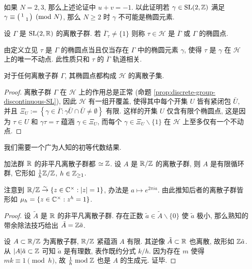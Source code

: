 \begin{exercise}\label{exo:Gamma-neat}
	如果 $N = 2,3$, 那么上述论证中 $u + v = -1$. 以此证明若 $\gamma \in \operatorname{SL}(2,\mathbb{Z})$ 满足 $\gamma \equiv \bigl(\begin{smallmatrix} 1 &  \\  & 1 \end{smallmatrix}\bigr) \pmod{N}$, 那么 $N \geq 2$ 时 $\gamma$ 不可能是椭圆元素.
\end{exercise}

\begin{definition}[椭圆点]\label{def:elliptic-point} 
	设 $\Gamma$ 是 $\operatorname{SL}(2,\mathbb{R})$ 的离散子群. 若 $\overline{\Gamma}_\tau \neq \{1\}$ 则称 $\tau \in \mathcal{H}$ 是 $\overline{\Gamma}$ 或 $\Gamma$ 的椭圆点.
\end{definition}

由定义立见 $\tau$ 是 $\Gamma$ 的椭圆点当且仅当存在 $\Gamma$ 中的椭圆元素 $\gamma$, 使得 $\tau$ 是 $\gamma$ 在 $\mathcal{H}$ 上的唯一不动点. 此性质只和 $\tau$ 的 $\overline{\Gamma}$ 轨道相关.

\begin{lemma}\label{prop:elliptic-pt-discrete}
	对于任何离散子群 $\Gamma$, 其椭圆点都构成 $\mathcal{H}$ 的离散子集.
\end{lemma}
\begin{proof}
	离散子群 $\Gamma$ 在 $\mathcal{H}$ 上的作用总是正常 (命题 \ref{prop:discrete-group-discontinuous-SL}), 因此 $\mathcal{H}$ 有一组开覆盖, 使得其中每个开集 $U$ 皆有紧闭包 $\bar{U}$, 并且 $\Xi_U := \left\{ \gamma \in \overline{\Gamma}: \gamma\bar{U} \cap \bar{U} \neq \emptyset\right\}$ 有限. 这样的开集 $U$ 仅含有限个椭圆点, 这是因为 $\tau \in U$ 和 $\gamma\tau = \tau$ 蕴涵 $\gamma \in \Xi_U$, 而每个 $\gamma \in \Xi_U \smallsetminus \{1\}$ 在 $\mathcal{H}$ 上至多仅有一个不动点.
\end{proof}

我们需要一个广为人知的初等代数结果.
\begin{proposition}\label{prop:disc-subgroup-circle}
	加法群 $\mathbb{R}$ 的非平凡离散子群都 $\simeq \mathbb{Z}$. 设 $A$ 是 $\mathbb{R}/\mathbb{Z}$ 的离散子群, 则 $A$ 是有限循环群, 它形如 $\frac{1}{h}\mathbb{Z}/\mathbb{Z}$, $h \in \mathbb{Z}_{\geq 1}$.
\end{proposition}

注意到 $\mathbb{R}/\mathbb{Z} \stackrel{\sim}{\rightarrow} \{z \in \mathbb{C}^\times: |z|=1 \}$, 办法是 $a \mapsto e^{2\pi ia}$. 由此推知后者的离散子群皆形如 $\mu_h = \{z \in \mathbb{C}^\times : z^h=1 \}$.

\begin{proof}
	设 $\tilde{A}$ 是 $\mathbb{R}$ 的非平凡离散子群. 存在正数 $\tilde{a} \in \tilde{A} \smallsetminus \{0\}$ 使 $\tilde{a}$ 极小, 那么熟知的带余除法技巧给出 $\tilde{A} = \mathbb{Z}\tilde{a}$.
	
	设 $A \subset \mathbb{R}/\mathbb{Z}$ 为离散子群, $\mathbb{R}/\mathbb{Z}$ 紧蕴涵 $A$ 有限. 其逆像 $\tilde{A} \subset \mathbb{R}$ 也离散, 故形如 $\mathbb{Z}\tilde{a}$. 从 $|A| \tilde{a} \subset \mathbb{Z}$ 可知 $\tilde{a}$ 是有理数, 表作既约分式 $k/h$. 因为存在 $m$ 使得 $mk \equiv 1 \pmod h$, 故 $\frac{1}{h} \bmod \mathbb{Z}$ 也是 $A$ 的生成元. 证毕.
\end{proof}

